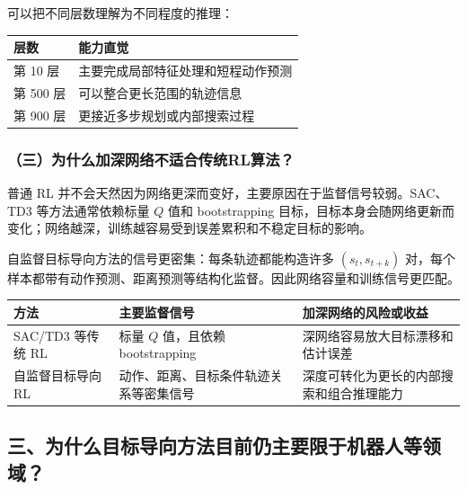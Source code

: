 可以把不同层数理解为不同程度的推理：

\begin{longtable}[]{@{}
  >{\raggedright\arraybackslash}p{}
  >{\raggedright\arraybackslash}p{}@{}}
\toprule
层数 & 能力直觉 \\
\midrule
\endhead
第 10 层 & 主要完成局部特征处理和短程动作预测 \\
第 500 层 & 可以整合更长范围的轨迹信息 \\
第 900 层 & 更接近多步规划或内部搜索过程 \\
\bottomrule
\end{longtable}

\hypertarget{ux4e09ux4e3aux4ec0ux4e48ux52a0ux6df1ux7f51ux7edcux4e0dux9002ux5408ux4f20ux7edfrlux7b97ux6cd5}{%
\subsubsection{（三）为什么加深网络不适合传统RL算法？}\label{ux4e09ux4e3aux4ec0ux4e48ux52a0ux6df1ux7f51ux7edcux4e0dux9002ux5408ux4f20ux7edfrlux7b97ux6cd5}}

普通 RL 并不会天然因为网络更深而变好，主要原因在于监督信号较弱。SAC、TD3 等方法通常依赖标量 \(Q\) 值和 bootstrapping 目标，目标本身会随网络更新而变化；网络越深，训练越容易受到误差累积和不稳定目标的影响。

自监督目标导向方法的信号更密集：每条轨迹都能构造许多 \((s_t,s_{t+k})\) 对，每个样本都带有动作预测、距离预测等结构化监督。因此网络容量和训练信号更匹配。

\begin{longtable}[]{@{}
  >{\raggedright\arraybackslash}p{}
  >{\raggedright\arraybackslash}p{}
  >{\raggedright\arraybackslash}p{}@{}}
\toprule
方法 & 主要监督信号 & 加深网络的风险或收益 \\
\midrule
\endhead
SAC/TD3 等传统 RL & 标量 \(Q\) 值，且依赖 bootstrapping & 深网络容易放大目标漂移和估计误差 \\
自监督目标导向 RL & 动作、距离、目标条件轨迹关系等密集信号 & 深度可转化为更长的内部搜索和组合推理能力 \\
\bottomrule
\end{longtable}

\hypertarget{ux4e09ux4e3aux4ec0ux4e48ux76eeux6807ux5bfcux5411ux65b9ux6cd5ux76eeux524dux4ecdux4e3bux8981ux9650ux4e8eux673aux5668ux4ebaux7b49ux9886ux57df}{%
\subsection{三、为什么目标导向方法目前仍主要限于机器人等领域？}\label{ux4e09ux4e3aux4ec0ux4e48ux76eeux6807ux5bfcux5411ux65b9ux6cd5ux76eeux524dux4ecdux4e3bux8981ux9650ux4e8eux673aux5668ux4ebaux7b49ux9886ux57df}}

